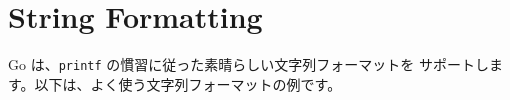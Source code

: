 \section{String Formatting}

Go は、\texttt{printf} の慣習に従った素晴らしい文字列フォーマットを サポートします。以下は、よく使う文字列フォーマットの例です。




